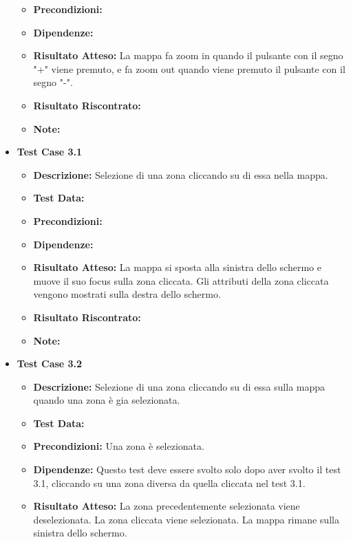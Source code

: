 \begin{itemize}
\begin{itemize}
                    \item \textbf{Precondizioni:} 
                    \item \textbf{Dipendenze:}
                    \item \textbf{Risultato Atteso:} La mappa fa zoom in quando il pulsante con il segno "+" viene premuto, e fa zoom out quando viene premuto il pulsante con il segno "-".
                    \item \textbf{Risultato Riscontrato:}
                    \item \textbf{Note:}
                \end{itemize}
            \item \textbf{Test Case 3.1}
                \begin{itemize}
                    \item \textbf{Descrizione:} Selezione di una zona cliccando su di essa nella mappa.
                    \item \textbf{Test Data:}
                    \item \textbf{Precondizioni:} 
                    \item \textbf{Dipendenze:}
                    \item \textbf{Risultato Atteso:} La mappa si sposta alla sinistra dello schermo e muove il suo focus sulla zona cliccata. Gli attributi della zona cliccata vengono mostrati sulla destra dello schermo.
                    \item \textbf{Risultato Riscontrato:}
                    \item \textbf{Note:}
                \end{itemize}
            \item \textbf{Test Case 3.2}
                \begin{itemize}
                    \item \textbf{Descrizione:} Selezione di una zona cliccando su di essa sulla mappa quando una zona è gia selezionata.
                    \item \textbf{Test Data:}
                    \item \textbf{Precondizioni:} Una zona è selezionata.
                    \item \textbf{Dipendenze:} Questo test deve essere svolto solo dopo aver svolto il test 3.1, cliccando su una zona diversa da quella cliccata nel test 3.1.
                    \item \textbf{Risultato Atteso:} La zona precedentemente selezionata viene deselezionata. La zona cliccata viene selezionata. La mappa rimane sulla sinistra dello schermo.

\end{itemize}
\end{itemize}
